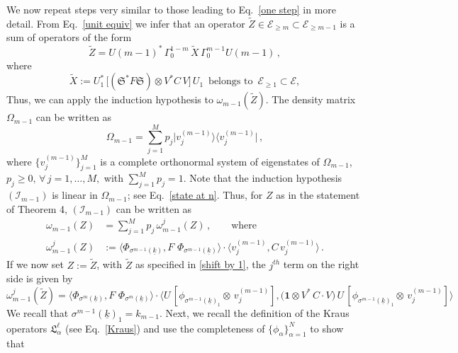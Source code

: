 \documentclass[a4paper,11pt]{article}
\begin{document}
We now repeat steps very similar to those leading to Eq.~\eqref{one step} in more detail.
From Eq.~\eqref{unit equiv} we infer that an operator 
$\tilde{Z} \in \mathcal{E}_{\geq m}\subset \mathcal{E}_{\geq m-1}$ is a sum of operators of the form
\begin{equation}\label{shift by 1}
\tilde{Z} = U(m-1)^{*} \,\Gamma_{0}^{1-m}\, \tilde{X}\,\Gamma_{0}^{m-1} U(m-1)\,,
\end{equation}
where 
$$\tilde{X}:= U_{1}^{*}\, \big[(\mathfrak{S}^{*}F\mathfrak{S})\otimes V^{*}C\,V\big]\,U_1 \,\text{ belongs to }\, \mathcal{E}_{\geq 1}\subset \mathcal{E},$$
Thus, we can apply the induction hypothesis to $\omega_{m-1}(\tilde{Z})$. 
The density matrix $\Omega_{m-1}$ can be written as
\begin{equation}\label{matrix}
\Omega_{m-1}= \sum_{j=1}^{M} p_j \vert v_j^{(m-1)}\rangle \langle v_j^{(m-1)} \vert\,,
\end{equation}
where $\big\{ v_{j}^{(m-1)} \big\}_{j=1}^{M}$ is a complete orthonormal system of eigenstates of $\Omega_{m-1}$, $p_j \geq 0,\,\forall \,j=1,\dots, M,$ with \mbox{$\sum_{j=1}^{M}p_j =1$.}
Note that the induction hypothesis $(\mathcal{I}_{m-1})$ is linear in $\Omega_{m-1}$; see Eq.~\eqref{state at n}. Thus, for $Z$ as in the statement of Theorem 4, $(\mathcal{I}_{m-1})$ can be written as
\begin{align}\label{expand}
\omega_{m-1}(Z)&=\sum_{j=1}^{M} p_j \,\omega_{m-1}^{j}(Z)\,, \qquad \text{where} \nonumber \\
 \omega_{m-1}^{j}(Z)&:= \langle \Phi_{\sigma^{m-1}(\underline{k})}, F\,\, \Phi_{\sigma^{m-1}(\underline{k})} \rangle \cdot \langle v_{j}^{(m-1)}, C\,v_{j}^{(m-1)}\rangle\,. 
\end{align}
If we now set $Z:=\tilde{Z}$, with $\tilde{Z}$ as specified in \eqref{shift by 1}, the $j^{th}$ term on the right side is given by
\begin{equation}\label{jth term}
\omega_{m-1}^{j}(\tilde{Z})=\langle \Phi_{\sigma^{m}(\underline{k})}, F\,\, \Phi_{\sigma^{m}(\underline{k})} \rangle \cdot
\langle U\,[ \phi_{\sigma^{m-1}(\underline{k})_{1}}\otimes \,v_{j}^{(m-1)} ], \big(\mathbf{1}\otimes 
V^{*}\,C\cdot V \big)\,U\,[\phi_{\sigma^{m-1}(\underline{k})_{1}}\otimes \,v_{j}^{(m-1)} ]\rangle
\end{equation}
We recall that $\sigma^{m-1}(\underline{k})_1 = k_{m-1}$. Next, we recall the definition of the Kraus operators 
$\mathfrak{L}_{\alpha}^{\ell}$ (see Eq.~\eqref{Kraus}) and use the completeness of 
$\big\{\phi_{\alpha}\big\}_{\alpha=1}^{N}$ to show that
\end{document}
